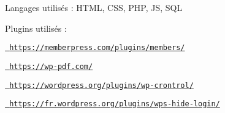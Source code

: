 Langages utilisés \+: HTML, CSS, PHP, JS, SQL

Plugins utilisés \+:
\begin{DoxyItemize}
\item \href{https://memberpress.com/plugins/members/}{\texttt{ https\+://memberpress.\+com/plugins/members/}}
\item \href{https://wp-pdf.com/}{\texttt{ https\+://wp-\/pdf.\+com/}}
\item \href{https://wordpress.org/plugins/wp-crontrol/}{\texttt{ https\+://wordpress.\+org/plugins/wp-\/crontrol/}}
\item \href{https://fr.wordpress.org/plugins/wps-hide-login/}{\texttt{ https\+://fr.\+wordpress.\+org/plugins/wps-\/hide-\/login/}} 
\end{DoxyItemize}